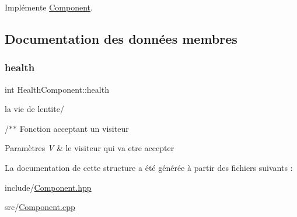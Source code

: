 Implémente \hyperlink{structComponent_a1d42068fda4a9bf6571810f669b3bb21}{Component}.



\subsection{Documentation des données membres}
\mbox{\label{structHealthComponent_a44675c84af2972a0cee11b9fff5880b5}} 
\subsubsection{\texorpdfstring{health}{health}}
{\footnotesize\ttfamily int Health\+Component\+::health}


\begin{DoxyItemize}
\item la vie de l\textquotesingle{}entite/
\end{DoxyItemize}

/$\ast$$\ast$ Fonction acceptant un visiteur


\begin{DoxyParams}{Paramètres}
{\em V} & le visiteur qui va etre accepter \\
\hline
\end{DoxyParams}


La documentation de cette structure a été générée à partir des fichiers suivants \+:\begin{DoxyCompactItemize}
\item 
include/\hyperlink{Component_8hpp}{Component.\+hpp}\item 
src/\hyperlink{Component_8cpp}{Component.\+cpp}\end{DoxyCompactItemize}
